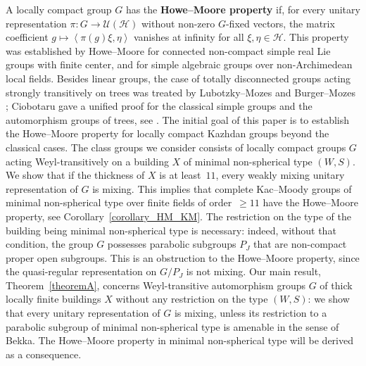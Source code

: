 \documentclass[12pt,a4paper]{amsproc}
\theoremstyle{definition}
\newcommand{\cH}{\mathcal H}
\newcommand{\cU}{\mathcal U}
\newcommand{\ip}[2]{\left\langle #1,#2\right\rangle}
\begin{document}
A locally compact group $G$ has the \textbf{Howe--Moore property} if, for every   unitary representation $\pi \colon G\to \cU(\cH)$ without non-zero $G$-fixed vectors, the matrix coefficient $g\mapsto \ip{\pi(g)\xi}{\eta}$ vanishes at infinity for all $\xi,\eta\in\cH$. This property was established by Howe--Moore \cite{HoweMoore1979} for connected non-compact simple real Lie groups with finite center, and for simple algebraic groups over non-Archimedean local fields.
Besides  linear groups, the case of totally disconnected groups acting strongly transitively on trees  was treated by Lubotzky--Mozes \cite{LubotzkyMozes1992} and Burger--Mozes \cite[Prop.~4.2]{BuMo_lattices}; Ciobotaru gave a unified proof for the classical simple groups and the automorphism groups of trees, see \cite{Ciobotaru}.
The initial goal of this paper is to establish the Howe--Moore property for locally compact Kazhdan groups beyond the classical cases. The class groups we consider consists of locally compact groups $G$ acting Weyl-transitively on a building $X$ of minimal non-spherical type $(W, S)$. We show that if the thickness of $X$ is at least~$11$, every weakly mixing unitary representation of $G$ is mixing. This implies that complete Kac--Moody groups of minimal non-spherical type over finite fields of order~$\geq 11$ have the Howe--Moore property, see Corollary~\ref{corollary_HM_KM}. The restriction on the type of the building being minimal non-spherical type is necessary: indeed, without that condition, the group $G$ possesses  parabolic subgroups $P_J$ that are non-compact proper open subgroups. This  is an obstruction to the Howe--Moore property, since the quasi-regular representation on $G/P_J$ is not mixing. Our main result, Theorem~\ref{theoremA}, concerns  Weyl-transitive automorphism groups $G$ of thick locally finite buildings $X$ without any restriction on  the type $(W, S)$: we show that  every   unitary representation of $G$ is mixing, unless its restriction to a parabolic subgroup of minimal non-spherical type is amenable in the sense of Bekka.  The Howe--Moore property in minimal non-spherical type will be derived as a consequence.
 
\end{document}
